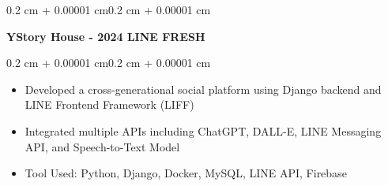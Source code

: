 \documentclass[10pt, letterpaper]{article}
\newenvironment{highlights}{
    \begin{itemize}[
        topsep=0.05 cm,
        parsep=0.05 cm,
        partopsep=0pt,
        itemsep=0pt,
        leftmargin=0.4 cm + 10pt
    ]
}{
    \end{itemize}
}
\newenvironment{onecolentry}{
    \begin{adjustwidth}{0.2 cm + 0.00001 cm}{0.2 cm + 0.00001 cm}
}{
    \end{adjustwidth}
}
\newenvironment{twocolentry}[2][]{
    \onecolentry
    \def\secondColumn{#2}
    \setcolumnwidth{\fill, 4.5 cm}
    \begin{paracol}{2}
}{
    \switchcolumn \raggedleft \secondColumn
    \end{paracol}
    \endonecolentry
}
\let\hrefWithoutArrow\href
\renewcommand{\href}[2]{\hrefWithoutArrow{#1}{\ifthenelse{\equal{#2}{}}{ }{#2 }\raisebox{.15ex}{\footnotesize \faExternalLink*}}}
\begin{document}
        \begin{twocolentry}{
        \textit{\href{https://github.com/ChuEating1005/2024-LINE-FRESH}{Link}}}
            \textbf{YStory House - 2024 LINE FRESH} 
        \end{twocolentry}
        \vspace{0.05 cm}
        \begin{onecolentry}
            \begin{highlights}
                \item Developed a cross-generational social platform using Django backend and LINE Frontend Framework (LIFF)
                \item Integrated multiple APIs including ChatGPT, DALL-E, LINE Messaging API, and Speech-to-Text Model
                \item Tool Used: Python, Django, Docker, MySQL, LINE API, Firebase
            \end{highlights}
        \end{onecolentry}
        
        
\end{document}
